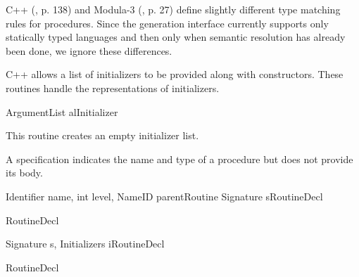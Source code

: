 C++ (\cite{ellis:90}, p. 138) and Modula-3 (\cite{Cardelli:95}, p. 27)
define slightly different type matching rules for procedures.  Since
the generation interface currently supports only statically typed
languages and then only when semantic resolution has already been
done, we ignore these differences.


C++ allows a list of initializers to be provided along with
constructors.  These routines handle the representations of
initializers.

	{ArgumentList al}{Initializer}
\begin{functionality}
\end{functionality}
\begin{functionality}
This routine creates an empty initializer list.
\end{functionality}

A specification indicates the name and type of a procedure but does
not provide its body.  

	{Identifier name, int level, NameID parentRoutine}
	{Signature s}{RoutineDecl}



	{RoutineDecl}

	{Signature s, Initializers i}{RoutineDecl}

	{RoutineDecl}


